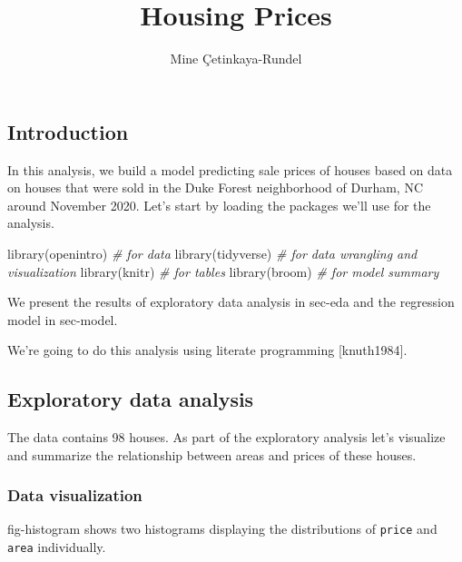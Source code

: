 \documentclass[
  letterpaper,
  DIV=11,
  numbers=noendperiod,
  oneside]{scrartcl}
\title{Housing Prices}
\author{Mine Çetinkaya-Rundel}
\date{}
\newenvironment{Shaded}{}{}
\newcommand{\CommentTok}[1]{\textcolor[rgb]{0.38,0.63,0.69}{\textit{#1}}}
\newcommand{\FunctionTok}[1]{\textcolor[rgb]{0.02,0.16,0.49}{#1}}
\newcommand{\NormalTok}[1]{#1}
\renewcommand*\contentsname{Table of contents}
\newcommand\contentsname{Table of contents}
\begin{document}
\maketitle
\renewcommand*\contentsname{Table of contents}
{
\hypersetup{linkcolor=}
\setcounter{tocdepth}{3}
\tableofcontents
}
\hypertarget{introduction}{%
\subsection{Introduction}\label{introduction}}

In this analysis, we build a model predicting sale prices of houses
based on data on houses that were sold in the Duke Forest neighborhood
of Durham, NC around November 2020. Let's start by loading the packages
we'll use for the analysis.

\begin{Shaded}
\begin{Highlighting}[]
\FunctionTok{library}\NormalTok{(openintro)  }\CommentTok{\# for data}
\FunctionTok{library}\NormalTok{(tidyverse)  }\CommentTok{\# for data wrangling and visualization}
\FunctionTok{library}\NormalTok{(knitr)      }\CommentTok{\# for tables}
\FunctionTok{library}\NormalTok{(broom)      }\CommentTok{\# for model summary}
\end{Highlighting}
\end{Shaded}

We present the results of exploratory data analysis in sec-eda and the
regression model in sec-model.

We're going to do this analysis using literate programming
{[}knuth1984{]}.

\hypertarget{sec-eda}{%
\subsection{Exploratory data analysis}\label{sec-eda}}

The data contains 98 houses. As part of the exploratory analysis let's
visualize and summarize the relationship between areas and prices of
these houses.

\hypertarget{data-visualization}{%
\subsubsection{Data visualization}\label{data-visualization}}

fig-histogram shows two histograms displaying the distributions of
\texttt{price} and \texttt{area} individually.
\end{document}
